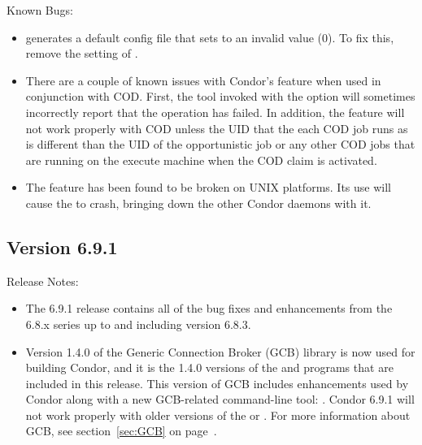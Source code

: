 \noindent Known Bugs:

\begin{itemize}

\item {} generates a default config file that sets
 to an invalid value (0).  To fix this,
remove the setting of .

\item There are a couple of known issues with Condor's
 feature when used in conjunction with
COD. First, the  tool invoked with the
 option will sometimes incorrectly report that the
operation has failed. In addition, the 
feature will not work properly with COD unless the UID that the each
COD job runs as is different than the UID of the opportunistic job or
any other COD jobs that are running on the execute machine when the
COD claim is activated.

\item The  feature has been found
to be broken on UNIX platforms. Its use will cause the 
to crash, bringing down the other Condor daemons with it.

\end{itemize}



\subsection*{\label{sec:New-6-9-1}Version 6.9.1}

\noindent Release Notes:

\begin{itemize}

\item The 6.9.1 release contains all of the bug fixes and enhancements
  from the 6.8.x series up to and including version 6.8.3.

\item Version 1.4.0 of the Generic Connection Broker (GCB) library is
  now used for building Condor, and it is the 1.4.0 versions of the
   and  programs that are
  included in this release.
  This version of GCB includes enhancements used by Condor
  along with a new GCB-related command-line tool:
  .
  Condor 6.9.1 will not work properly with older versions of the
   or .
  For more information about GCB, see section~\ref{sec:GCB} on
  page~\pageref{sec:GCB}. 

\end{itemize}

